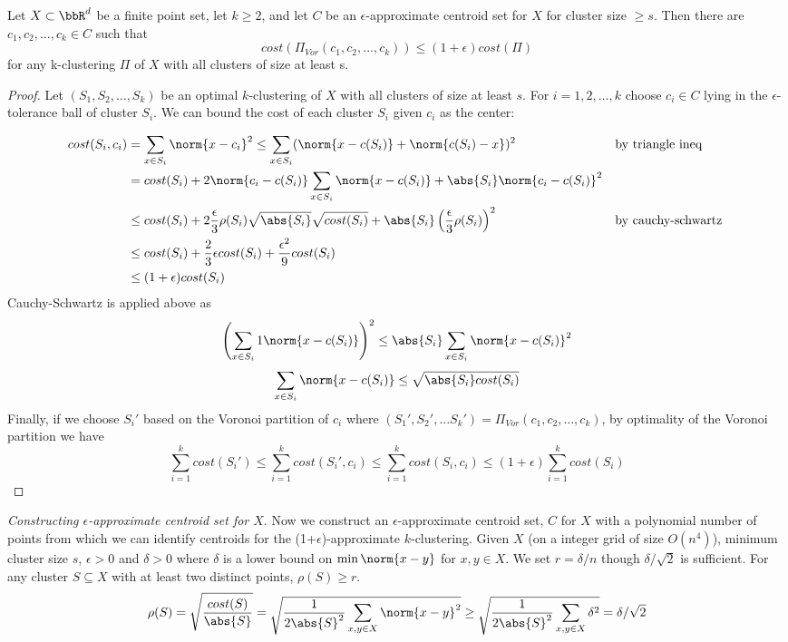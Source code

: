 \begin{lemma}
Let $X \subset \bbR^d$ be a finite point set, let $k\geq 2$, and let $C$ be an $\epsilon$-approximate centroid set for $X$ for cluster size $\geq s$. Then there are $c_1, c_2, \dots, c_k \in C$ such that 
$$cost(\Pi_{Vor}(c_1, c_2, \dots, c_k)) \leq (1+\epsilon)cost(\Pi)$$
for any k-clustering $\Pi$ of $X$ with all clusters of size at least s. 
\end{lemma}
\begin{proof}
Let $(S_1, S_2, \dots, S_k)$ be an optimal $k$-clustering of $X$ with all clusters of size at least $s$. For $i = 1,2,\dots,k$ choose $c_i \in C$ lying in the $\epsilon$-tolerance ball of cluster $S_i$. We can bound the cost of each cluster $S_i$ given $c_i$ as the center:

\begin{align*}
    cost(S_i, c_i) & = \sum_{x \in S_i}\norm{x-c_i}^2 \leq \sum_{x \in S_i} (\norm{x-c(S_i)} + \norm{c(S_i)-x})^2  && \text{by triangle ineq} \\
    & = cost(S_i) + 2\norm{c_i-c(S_i)}\sum_{x \in S_i}\norm{x-c(S_i)} + \abs{S_i}\norm{c_i-c(S_i)}^2 \\
    & \leq cost(S_i) + 2\frac{\epsilon}{3}\rho(S_i)\sqrt{\abs{S_i}}\sqrt{cost(S_i)} + \abs{S_i}\left(\frac{\epsilon}{3}\rho(S_i) \right)^2 && \text{by cauchy-schwartz } \\
    & \leq cost(S_i) + \frac{2}{3}\epsilon cost(S_i) + \frac{\epsilon^2}{9}cost(S_i) \\
    & \leq (1+\epsilon) cost(S_i)
\end{align*}
Cauchy-Schwartz is applied above as
$$\left( \sum_{x \in S_i}1\norm{x-c(S_i)} \right)^2 \leq \abs{S_i}\sum_{x \in S_i}\norm{x-c(S_i)}^2 $$
$$ \sum_{x \in S_i}\norm{x-c(S_i)} \leq \sqrt{\abs{S_i}cost(S_i)} $$
Finally, if we choose $S_i'$ based on the Voronoi partition of $c_i$
where $(S_1', S_2', \dots S_k') =\Pi_{Vor}(c_1, c_2, \dots, c_k) $, by optimality of the Voronoi partition we have
$$\sum_{i=1}^k cost(S_i') \leq \sum_{i=1}^k cost(S_i', c_i) \leq \sum_{i=1}^k cost(S_i, c_i) \leq (1+\epsilon) \sum_{i=1}^k cost(S_i)$$
\end{proof}

\noindent \emph{Constructing $\epsilon$-approximate centroid set for $X$}. Now we construct an $\epsilon$-approximate centroid set, $C$ for $X$ with a polynomial number of points from which we can identify centroids for the (1+$\epsilon$)-approximate $k$-clustering. Given $X$ (on a integer grid of size $O(n^4)$), minimum cluster size $s$, $\epsilon >0$ and $\delta >0$ where $\delta$ is a lower bound on $\min\norm{x-y}$ for $x,y\in X$. We set $r = \delta/n$ though $\delta/\sqrt{2}$ is sufficient. For any cluster $S \subseteq X$ with at least two distinct points, $\rho(S)\geq r$. 
 $$\rho(S) = \sqrt{\frac{cost(S)}{\abs{S}}} = \sqrt{\frac{1}{2\abs{S}^2}\sum_{x,y \in X}\norm{x-y}^2} \geq \sqrt{\frac{1}{2\abs{S}^2}\sum_{x,y \in X}\delta^2} =  \delta/\sqrt{2}$$
 

